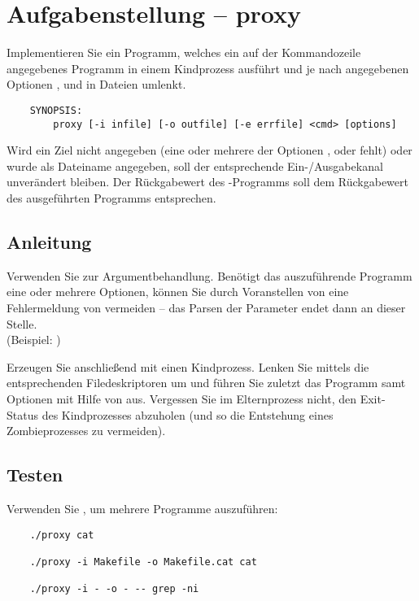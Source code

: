 




\section*{Aufgabenstellung -- proxy}

Implementieren Sie ein Programm, welches ein auf der Kommandozeile angegebenes
Programm in einem Kindprozess ausführt und je nach angegebenen Optionen
,  und  in Dateien umlenkt.

\begin{verbatim}
    SYNOPSIS:
        proxy [-i infile] [-o outfile] [-e errfile] <cmd> [options]
\end{verbatim}

Wird ein Ziel nicht angegeben (eine oder mehrere der Optionen ,
 oder  fehlt) oder wurde \osuearg{-} als Dateiname
angegeben, soll der entsprechende Ein-/Ausgabekanal unverändert bleiben. Der
Rückgabewert des -Programms soll dem Rückgabewert des
ausgeführten Programms entsprechen.

\subsection*{Anleitung}

Verwenden Sie  zur Argumentbehandlung. Benötigt das
auszuführende Programm eine oder mehrere Optionen, können Sie durch Voranstellen
von \osuearg{--} eine Fehlermeldung von  vermeiden -- das
Parsen der Parameter endet dann an dieser Stelle.\\
(Beispiel: )

Erzeugen Sie anschließend mit  einen Kindprozess. Lenken Sie
mittels  die entsprechenden Filedeskriptoren um und führen Sie
zuletzt das Programm samt Optionen mit Hilfe von  aus.
Vergessen Sie im Elternprozess nicht, den Exit-Status des Kindprozesses abzuholen
(und so die Entstehung eines Zombieprozesses zu vermeiden).

\subsection*{Testen}

Verwenden Sie , um mehrere Programme auszuführen:

\begin{verbatim}
	./proxy cat

	./proxy -i Makefile -o Makefile.cat cat

	./proxy -i - -o - -- grep -ni
\end{verbatim}

\osueguidelinestwo


